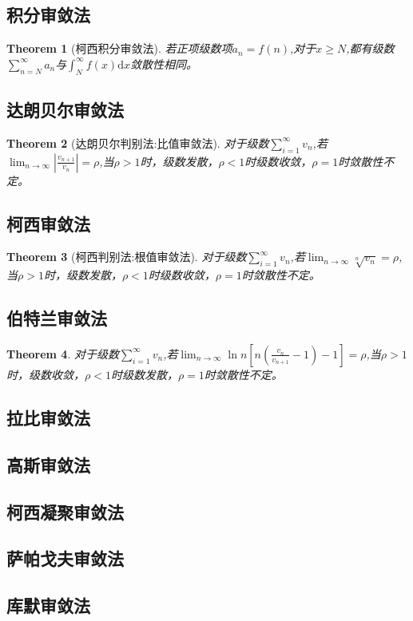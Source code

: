 \documentclass[12pt,a4paper,UTF8]{ctexbook}
\theoremstyle{plain}
\newtheorem{theorem}{\indent Theorem}[section]
\begin{document}
\subsection{积分审敛法}
\begin{theorem}[柯西积分审敛法]
若正项级数项$a_n=f(n)$,对于$x\geq N$,都有级数$\sum_{n=N}^\infty a_n$与$\int_{N}^\infty f(x)\mathrm d x$敛散性相同。
\end{theorem}
\subsection{达朗贝尔审敛法}
\begin{theorem}[达朗贝尔判别法:比值审敛法]
对于级数$\sum_{i=1}^\infty v_n$,若$\lim_{n\to\infty}|\frac{v_{n+1}}{v_n}|=\rho$,当$\rho>1$时，级数发散，$\rho<1$时级数收敛，$\rho=1$时敛散性不定。
\end{theorem}
\subsection{柯西审敛法}
\begin{theorem}[柯西判别法:根值审敛法]
对于级数$\sum_{i=1}^\infty v_n$,若$\lim_{n\to\infty}\sqrt[n]{v_n}=\rho$,当$\rho>1$时，级数发散，$\rho<1$时级数收敛，$\rho=1$时敛散性不定。
\end{theorem}
\subsection{伯特兰审敛法}
\begin{theorem}
    对于级数$\sum_{i=1}^\infty v_n$,若$\lim_{n\to\infty}\ln n[n(\frac{v_n}{v_{n+1}}-1)-1]=\rho$,当$\rho>1$时，级数收敛，$\rho<1$时级数发散，$\rho=1$时敛散性不定。
\end{theorem}
\subsection{拉比审敛法}
\subsection{高斯审敛法}
\subsection{柯西凝聚审敛法}
\subsection{萨帕戈夫审敛法}
\subsection{库默审敛法}
\end{document}
